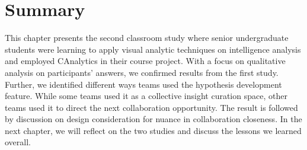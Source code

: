 \section{Summary}
This chapter presents the second classroom study where senior undergraduate students were learning to apply visual analytic techniques on intelligence analysis and employed CAnalytics in their course project. With a focus on qualitative analysis on participants' answers, we confirmed results from the first study. Further, we identified different ways teams used the hypothesis development feature. While some teams used it as a collective insight curation space, other teams used it to direct the next collaboration opportunity. The result is followed by discussion on design consideration for nuance in collaboration closeness. In the next chapter, we will reflect on the two studies and discuss the lessons we learned overall.